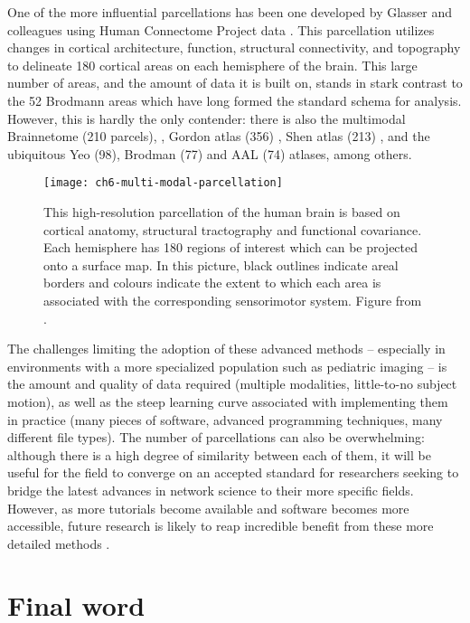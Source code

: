 One of the more influential parcellations has been one developed by Glasser and colleagues using Human Connectome Project data \citep{Glasser2016}. This parcellation utilizes changes in cortical architecture, function, structural connectivity, and topography to delineate 180 cortical areas on each hemisphere of the brain. This large number of areas, and the amount of data it is built on, stands in stark contrast to the 52 Brodmann areas which have long formed the standard schema for analysis. However, this is hardly the only contender: there is also the multimodal Brainnetome (210 parcels), \citep{Fan2016}, Gordon atlas (356) \citep{Gordon2016}, Shen atlas (213) \citep{Shen2013}, and the ubiquitous Yeo (98), Brodman (77) and AAL (74) atlases, among others. 

\begin{figure}[t]
	\centering
	\texttt{[image: ch6-multi-modal-parcellation]}
	\caption[Multi-modal parcellation of the human brain.]{This high-resolution parcellation of the human brain is based on cortical anatomy, structural tractography and functional covariance. Each hemisphere has 180 regions of interest which can be projected onto a surface map. In this picture, black outlines indicate areal borders and colours indicate the extent to which each area is associated with the corresponding sensorimotor system. Figure from \citep{Glasser2016}.}
	\label{fig:ch6-multi-modal-parcellation}
\end{figure}

The challenges limiting the adoption of these advanced methods -- especially in environments with a more specialized population such as pediatric imaging -- is the amount and quality of data required (multiple modalities, little-to-no subject motion), as well as the steep learning curve associated with implementing them in practice (many pieces of software, advanced programming techniques, many different file types). The number of parcellations can also be overwhelming: although there is a high degree of similarity between each of them, it will be useful for the field to converge on an accepted standard for researchers seeking to bridge the latest advances in network science to their more specific fields. However, as more tutorials become available and software becomes more accessible, future research is likely to reap incredible benefit from these more detailed methods \citep{Poldrack2015}.

\section{Final word}

